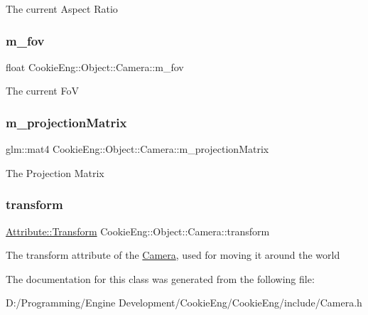 The current Aspect Ratio \mbox{\label{class_cookie_eng_1_1_object_1_1_camera_a8ec41f98d646a5c9dd733157ee41f435}} 
\subsubsection{\texorpdfstring{m\+\_\+fov}{m\_fov}}
{\footnotesize\ttfamily float Cookie\+Eng\+::\+Object\+::\+Camera\+::m\+\_\+fov\hspace{0.3cm}{\ttfamily [protected]}}

The current FoV \mbox{\label{class_cookie_eng_1_1_object_1_1_camera_a6a5152fd8fbd92c4cbcc73d14511e584}} 
\subsubsection{\texorpdfstring{m\+\_\+projection\+Matrix}{m\_projectionMatrix}}
{\footnotesize\ttfamily glm\+::mat4 Cookie\+Eng\+::\+Object\+::\+Camera\+::m\+\_\+projection\+Matrix\hspace{0.3cm}{\ttfamily [protected]}}

The Projection Matrix \mbox{\label{class_cookie_eng_1_1_object_1_1_camera_ae991b0b27c6be58d11f44dbfd3092956}} 
\subsubsection{\texorpdfstring{transform}{transform}}
{\footnotesize\ttfamily \hyperlink{class_cookie_eng_1_1_attribute_1_1_transform}{Attribute\+::\+Transform} Cookie\+Eng\+::\+Object\+::\+Camera\+::transform}

The transform attribute of the \hyperlink{class_cookie_eng_1_1_object_1_1_camera}{Camera}, used for moving it around the world 

The documentation for this class was generated from the following file\+:\begin{DoxyCompactItemize}
\item 
D\+:/\+Programming/\+Engine Development/\+Cookie\+Eng/\+Cookie\+Eng/include/Camera.\+h\end{DoxyCompactItemize}
